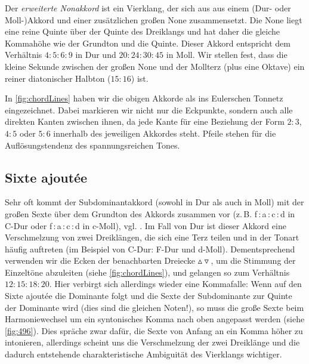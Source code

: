 Der \emph{erweiterte Nonakkord} ist ein Vierklang, der sich aus aus einem (Dur-
oder Moll-)Akkord und einer zusätzlichen großen None zusammensetzt.  Die None
liegt eine reine Quinte über der Quinte des Dreiklangs und hat daher die gleiche
Kommahöhe wie der Grundton und die Quinte. Dieser
Akkord entspricht dem Verhältnis $4:5:6:9$ in Dur und $20:24:30:45$ in Moll. Wir
stellen fest, dass die kleine Sekunde zwischen der großen None und der Mollterz
(plus eine Oktave) ein reiner diatonischer Halbton ($15:16$) ist.

In \cref{fig:chordLines} haben wir die obigen Akkorde als ins Eulerschen Tonnetz
eingezeichnet. Dabei markieren wir nicht nur die Eckpunkte, sondern auch alle
direkten Kanten zwischen ihnen, da jede Kante für eine Beziehung der Form $2:3$,
$4:5$ oder $5:6$ innerhalb des jeweiligen Akkordes steht. Pfeile stehen für die
Auflösungstendenz des spannungsreichen Tones.

\subsection{Sixte ajoutée}
\label{sec:sixte}

Sehr oft kommt der Subdominantakkord (sowohl in Dur als auch in Moll) mit der
großen Sexte über dem Grundton des Akkords zusammen vor
(z.\,B. f\,:\,a\,:\,c\,:\,d in C-Dur oder f\,:\,\flat a\,:\,c\,:\,d in c-Moll),
vgl. \cite[{}9.3]{Skript}.  Im Fall von Dur ist dieser Akkord eine Verschmelzung
von zwei Dreiklängen, die sich eine Terz teilen und in der Tonart häufig
auftreten (im Beispiel von C-Dur: F-Dur und d-Moll). Dementsprechend verwenden
wir die Ecken der benachbarten Dreiecke $\vartriangle\!\!\!\triangledown$, um
die Stimmung der Einzeltöne abzuleiten (siehe \cref{fig:chordLines}), und
gelangen so zum Verhältnis $12:15:18:20$. Hier verbirgt sich allerdings wieder
eine Kommafalle: Wenn auf den Sixte ajoutée die Dominante folgt und die Sexte
der Subdominante zur Quinte der Dominante wird (dies sind die gleichen Noten!),
so muss die große Sexte beim Harmoniewechsel um ein syntonisches Komma nach oben
angepasst werden (siehe \cref{fig:496}).  Dies spräche zwar dafür, die Sexte von
Anfang an ein Komma höher zu intonieren, allerdings scheint uns die
Verschmelzung der zwei Dreiklänge und die dadurch entstehende charakteristische
Ambiguität des Vierklangs wichtiger.

